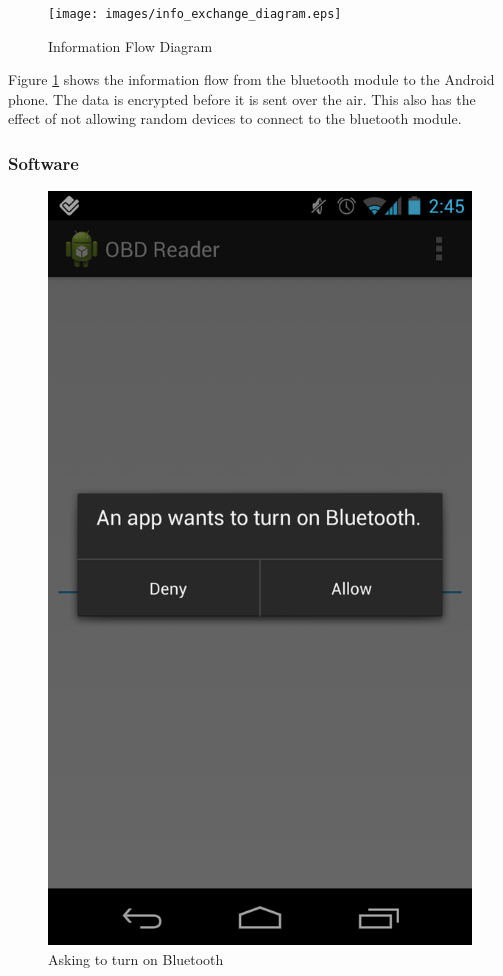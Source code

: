 \documentclass[12pt,letterpaper]{article}
\begin{document}
\begin{figure}[H]
\centering
\texttt{[image: images/info\_exchange\_diagram.eps]}
\caption{Information Flow Diagram}
\label{fig:flow}
\end{figure}

Figure \ref{fig:flow} shows the information flow from the bluetooth module to the Android phone. The data is encrypted before it is sent over the air. This also has the effect of not allowing random devices to connect to the bluetooth module. \\


\subsubsection{Software}
\begin{figure}[H]
\centering
\includegraphics[totalheight=15cm]{images/turnonbt.png}
\caption{Asking to turn on Bluetooth}
\label{fig: turnonbt}
\end{figure}
\end{document}
